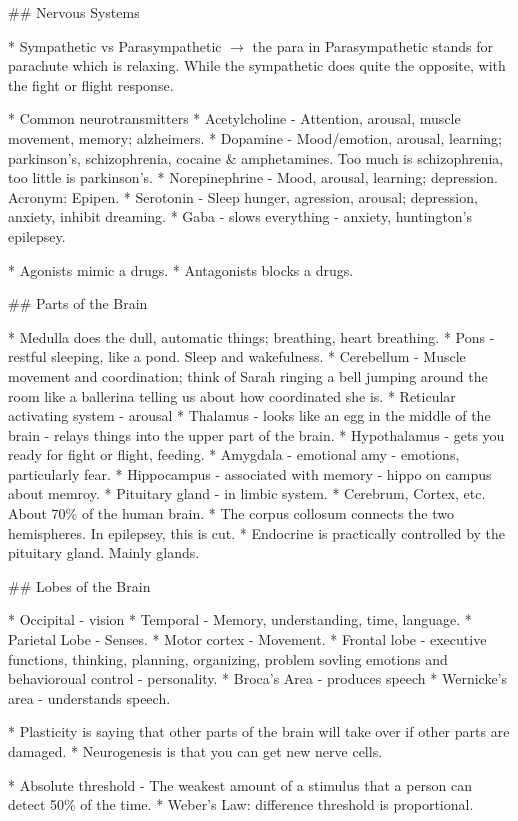\documentclass{article}
\begin{document}
\begin{markdown}
## Nervous Systems

* Sympathetic vs Parasympathetic $\rightarrow$ the para in Parasympathetic stands for parachute which is relaxing. While the sympathetic does quite the opposite, with the fight or flight response.

* Common neurotransmitters
	* Acetylcholine - Attention, arousal, muscle movement, memory; alzheimers.
	* Dopamine - Mood/emotion, arousal, learning; parkinson's, schizophrenia, cocaine & amphetamines. Too much is schizophrenia, too little is parkinson's.
	* Norepinephrine - Mood, arousal, learning; depression. Acronym: Epipen.
	* Serotonin - Sleep hunger, agression, arousal; depression, anxiety, inhibit dreaming.
	* Gaba - slows everything - anxiety, huntington's epilepsey.

* Agonists mimic a drugs.
* Antagonists blocks a drugs.

## Parts of the Brain

* Medulla does the dull, automatic things; breathing, heart breathing.
* Pons - restful sleeping, like a pond. Sleep and wakefulness.
* Cerebellum - Muscle movement and coordination; think of Sarah ringing a bell jumping around the room like a ballerina telling us about how coordinated she is.
* Reticular activating system - arousal
* Thalamus - looks like an egg in the middle of the brain - relays things into the upper part of the brain.
* Hypothalamus - gets you ready for fight or flight, feeding.
* Amygdala - emotional amy - emotions, particularly fear.
* Hippocampus - associated with memory - hippo on campus about memroy.
* Pituitary gland - in limbic system.
* Cerebrum, Cortex, etc. About 70\% of the human brain.
* The corpus collosum connects the two hemispheres. In epilepsey, this is cut.
* Endocrine is practically controlled by the pituitary gland. Mainly glands.

## Lobes of the Brain

* Occipital - vision
* Temporal - Memory, understanding, time, language.
* Parietal Lobe - Senses.
* Motor cortex - Movement.
* Frontal lobe - executive functions, thinking, planning, organizing, problem sovling emotions and behavioroual control - personality.
* Broca's Area - produces speech
* Wernicke's area - understands speech.

* Plasticity is saying that other parts of the brain will take over if other parts are damaged.
* Neurogenesis is that you can get new nerve cells.

* Absolute threshold - The weakest amount of a stimulus that a person can detect 50\% of the time.
* Weber's Law: difference threshold is proportional.

\end{markdown}
\end{document}
